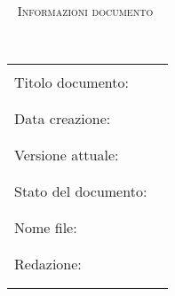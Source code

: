 
\begin{center}
\ \vspace{10 mm}
\textsc{\Large Informazioni documento}\\[0.7cm]
\end{center}
	\begin{center}
	\ \vspace{10 mm}\\
	\begin{tabular}{ll}
	\hline\\
	Titolo documento: & \varTitle\\
	\\ \\
	Data creazione: & \dataDocumento\\
	\\ \\
	Versione attuale: & \varVersione\\
	\\ \\
	Stato del documento: 	&\varStato\\
	\\ \\
	Nome file: 	&\varFile\\
	\\ \\
	Redazione: 	&\varRedattoreA\\



	\\ \\
	
	\end{tabular}
	\end{center}
\pagebreak
